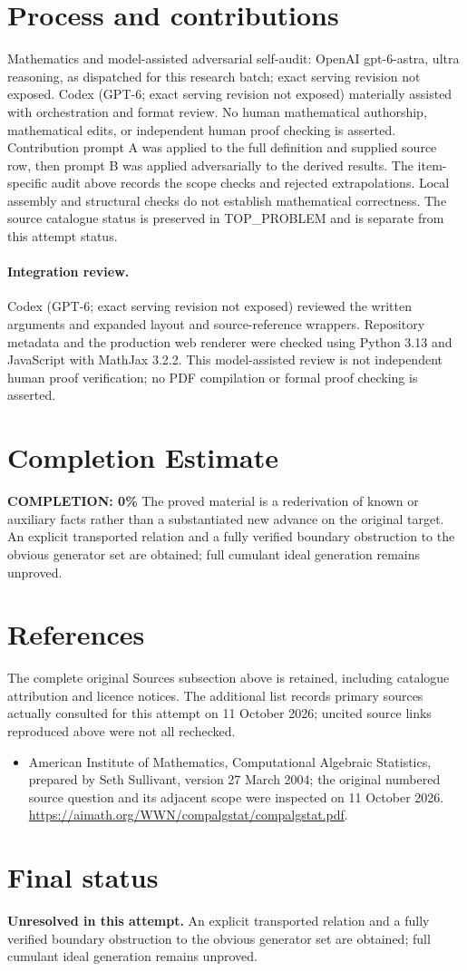 \documentclass[11pt]{article}
\begin{document}
\section{Process and contributions}
Mathematics and model-assisted adversarial self-audit: OpenAI gpt-6-astra, ultra reasoning, as dispatched for this research batch; exact serving revision not exposed. Codex (GPT-6; exact serving revision not exposed) materially assisted with orchestration and format review. No human mathematical authorship, mathematical edits, or independent human proof checking is asserted.
Contribution prompt A was applied to the full definition and supplied source row, then prompt B was applied adversarially to the derived results. The item-specific audit above records the scope checks and rejected extrapolations. Local assembly and structural checks do not establish mathematical correctness. The source catalogue status is preserved in TOP\_PROBLEM and is separate from this attempt status.
\paragraph{Integration review.} Codex (GPT-6; exact serving revision not exposed) reviewed the written arguments and expanded layout and source-reference wrappers. Repository metadata and the production web renderer were checked using Python 3.13 and JavaScript with MathJax 3.2.2. This model-assisted review is not independent human proof verification; no PDF compilation or formal proof checking is asserted.

\section{Completion Estimate}
\noindent\textbf{COMPLETION: 0\%}
The proved material is a rederivation of known or auxiliary facts rather than a substantiated new advance on the original target. An explicit transported relation and a fully verified boundary obstruction to the obvious generator set are obtained; full cumulant ideal generation remains unproved.
\section{References}
The complete original Sources subsection above is retained, including catalogue attribution and licence notices. The additional list records primary sources actually consulted for this attempt on 11 October 2026; uncited source links reproduced above were not all rechecked.
\begin{itemize}
\item American Institute of Mathematics, Computational Algebraic Statistics, prepared by Seth Sullivant, version 27 March 2004; the original numbered source question and its adjacent scope were inspected on 11 October 2026. \url{https://aimath.org/WWN/compalgstat/compalgstat.pdf}.
\end{itemize}
\section{Final status}
\textbf{Unresolved in this attempt.} An explicit transported relation and a fully verified boundary obstruction to the obvious generator set are obtained; full cumulant ideal generation remains unproved.
\end{document}
